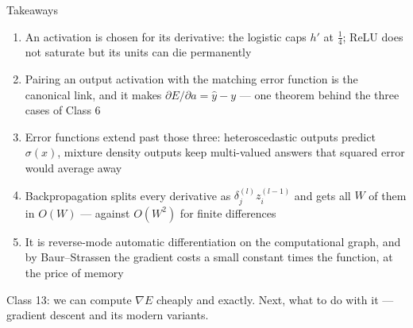 \documentclass[aspectratio=169, 11pt]{beamer}
\newcommand{\nosrc}{}       %
\begin{document}
\begin{frame}{Takeaways}
  \nosrc
  \vspace{-0.05em}
  {\footnotesize
  \begin{enumerate}\setlength{\itemsep}{0pt}
    \item An activation is chosen for its \alert{derivative}: the
          logistic caps $h'$ at $\tfrac14$; ReLU does not saturate but
          its units can \alert{die permanently}
    \item Pairing an output activation with the matching error function
          is the \alert{canonical link}, and it makes
          $\partial E/\partial a = \hat y - y$ --- one theorem behind
          the three cases of Class 6
    \item Error functions extend past those three:
          \alert{heteroscedastic} outputs predict $\sigma(x)$,
          \alert{mixture density} outputs keep multi-valued answers
          that squared error would average away
    \item \alert{Backpropagation} splits every derivative as
          $\delta^{(l)}_j z^{(l-1)}_i$ and gets all $W$ of them in
          $O(W)$ --- against $O(W^{2})$ for finite differences
    \item It is \alert{reverse-mode automatic differentiation} on the
          computational graph, and by Baur--Strassen the gradient costs
          a small constant times the function, at the price of memory
  \end{enumerate}}
  \vspace{0.05em}
  \begin{redhighlight}
    {\footnotesize Class 13: we can compute $\nabla E$ cheaply and
    exactly. Next, what to \alert{do} with it --- gradient descent and
    its modern variants.}
  \end{redhighlight}
\end{frame}
\end{document}
